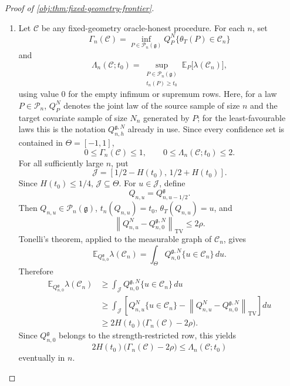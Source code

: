 \documentclass[11pt]{article}
\begin{document}
\begin{proof}[Proof of \cref{obj:thm:fixed-geometry-frontier}]
\begin{enumerate}
\item Let \(\mathscr C\) be any fixed-geometry oracle-honest procedure.  For each \(n\), set
\[
\Gamma_n(\mathscr C)
=
\inf_{P\in\mathcal P_n(\mathfrak g)}
Q_P^N\{\theta_T(P)\in \mathscr C_n\}
\]
and
\[
\Lambda_n(\mathscr C;t_0)
=
\sup_{\substack{P\in\mathcal P_n(\mathfrak g)\\ t_n(P)\ge t_0}}
\mathbb E_P\bigl[\lambda(\mathscr C_n)\bigr],
\]
using value \(0\) for the empty infimum or supremum rows.  Here, for a law \(P\in\mathcal P_n\), \(Q_P^{N}\) denotes the joint law of the source sample of size \(n\) and the target covariate sample of size \(N_n\) generated by \(P\); for the least-favourable laws this is the notation \(Q_{n,h}^{\mathfrak g,N}\) already in use.  Since every confidence set is contained in \(\Theta=[-1,1]\),
\[
0\le \Gamma_n(\mathscr C)\le 1,
\qquad
0\le \Lambda_n(\mathscr C;t_0)\le 2 .
\]
For all sufficiently large \(n\), put
\[
\mathcal J=[1/2-H(t_0),\,1/2+H(t_0)].
\]
Since \(H(t_0)\le1/4\), \(\mathcal J\subseteq\Theta\).  For \(u\in\mathcal J\), define
\[
Q_{n,u}=Q_{n,u-1/2}^{\mathfrak g}.
\]
Then \(Q_{n,u}\in\mathcal P_n(\mathfrak g)\), \(t_n(Q_{n,u})=t_0\), \(\theta_T(Q_{n,u})=u\), and
\[
\left\|Q_{n,u}^{N}-Q_{n,0}^{\mathfrak g,N}\right\|_{\mathrm{TV}}\le 2\rho .
\]
Tonelli's theorem, applied to the measurable graph of \(\mathscr C_n\), gives
\[
\mathbb E_{Q_{n,0}^{\mathfrak g}}\lambda(\mathscr C_n)
=
\int_{\Theta}
Q_{n,0}^{\mathfrak g,N}\{u\in\mathscr C_n\}\,du .
\]
Therefore
\[
\begin{aligned}
\mathbb E_{Q_{n,0}^{\mathfrak g}}\lambda(\mathscr C_n)
&\ge
\int_{\mathcal J}
Q_{n,0}^{\mathfrak g,N}\{u\in\mathscr C_n\}\,du\\
&\ge
\int_{\mathcal J}
\left[
Q_{n,u}^{N}\{u\in\mathscr C_n\}
-
\left\|Q_{n,u}^{N}-Q_{n,0}^{\mathfrak g,N}\right\|_{\mathrm{TV}}
\right]du\\
&\ge
2H(t_0)\bigl(\Gamma_n(\mathscr C)-2\rho\bigr).
\end{aligned}
\]
Since \(Q_{n,0}^{\mathfrak g}\) belongs to the strength-restricted row, this yields
\[
2H(t_0)\bigl(\Gamma_n(\mathscr C)-2\rho\bigr)
\le
\Lambda_n(\mathscr C;t_0)
\]
eventually in \(n\).


\end{enumerate}
\end{proof}
\end{document}
